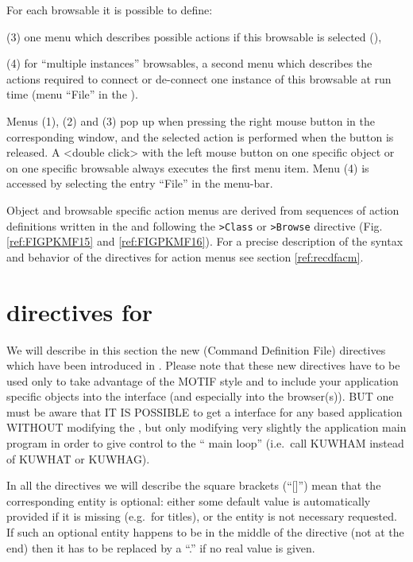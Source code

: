 For each browsable it is possible to define:
\begin{UL}
\item[(3)]
one menu which describes possible 
actions if this browsable is selected (\BW{}), 
\item[(4)]
for ``multiple instances'' browsables, a second menu which describes 
the actions required to connect or de-connect one instance of this 
browsable at run time (menu ``File'' in the \MB{}).
\end{UL}

Menus (1), (2) and (3) pop up when pressing the right mouse button 
in the corresponding window, and the
selected action is performed when the button is released. A <double click>
with the left mouse button on one specific object or on one specific 
browsable always executes the first menu item. Menu (4) is accessed by 
selecting the entry ``File'' in the \MB{} menu-bar.

Object and browsable specific action menus are derived from sequences of action 
definitions written in the \CDF{} and following the {\tt >Class} or 
{\tt >Browse} directive (Fig. \ref{ref:FIGPKMF15} and \ref{ref:FIGPKMF16}). 
For a precise description of the syntax and behavior 
of the \CDF{} directives for action menus see section \ref{ref:recdfacm}.


\section{\CDF{} directives for \KUIPMotif{}\label{Motif-CDF}}

\label{ref:recdf}

We will describe in this section the new \CDF{} (Command Definition File)
directives which have been introduced in \KUIPMotif{}. Please note that
these new directives have to be used only to take advantage of the MOTIF
style and to include your application specific objects into the interface
(and especially into the browser(s)). BUT one must be aware that IT IS 
POSSIBLE to get a \Motif{} interface for any \KUIP{} based application 
WITHOUT modifying the \CDF{}, but only modifying very slightly the 
application main program in order to give control to the ``\Motif{} main loop'' 
(i.e.\ call KUWHAM instead of KUWHAT or KUWHAG).

In all the directives we will describe the square brackets (``[]'') mean
that the corresponding entity is optional: either some default value
is automatically provided if it is missing (e.g.\ for titles), or the
entity is not necessary requested. If such an optional entity happens
to be in the middle of the directive (not at the end) then it has
to be replaced by a ``.'' if no real value is given.

